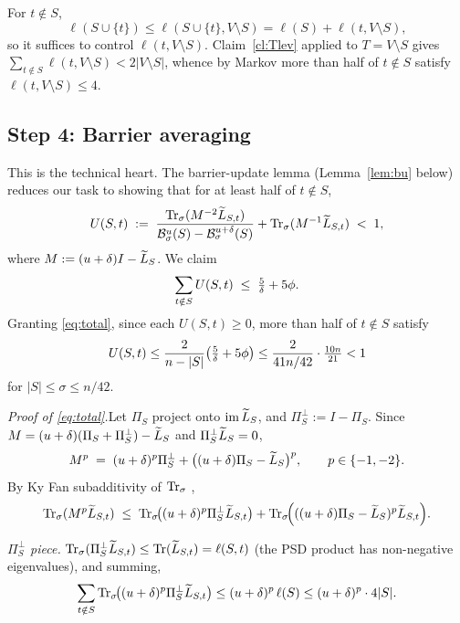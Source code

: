 \documentclass[11pt]{article}
\begin{document}
For $t\notin S$,
\[
  \ell(S\cup\{t\}) \le \ell(S\cup\{t\},V\setminus S)
                   = \ell(S)+\ell(t,V\setminus S),
\]
so it suffices to control $\ell(t,V\setminus S)$. Claim~\ref{cl:Tlev} applied
to $T=V\setminus S$ gives
$\sum_{t\notin S}\ell(t,V\setminus S)<2|V\setminus S|$, whence by Markov more
than half of $t\notin S$ satisfy $\ell(t,V\setminus S)\le 4$.

\subsection*{Step 4: Barrier averaging}

This is the technical heart. The barrier-update lemma (Lemma~\ref{lem:bu}
below) reduces our task to showing that for at least half of $t\notin S$,
\begin{equation}\label{eq:U}
  U(S,t) \;:=\;
  \frac{\operatorname{Tr}_{\sigma}(M^{-2}\widetilde{L}_{S,t})}{\mathcal{B}^{u}_{\sigma}(S)-\mathcal{B}^{u+\delta}_{\sigma}(S)}
   + \operatorname{Tr}_{\sigma}(M^{-1}\widetilde{L}_{S,t}) \;<\; 1,
\end{equation}
where $M:=(u+\delta)I-\widetilde{L}_S$. We claim
\begin{equation}\label{eq:total}
  \sum_{t\notin S} U(S,t) \;\le\; \tfrac{5}{\delta} + 5\phi.
\end{equation}
Granting \eqref{eq:total}, since each $U(S,t)\ge 0$, more than half of
$t\notin S$ satisfy
\[
  U(S,t)\le\frac{2}{n-|S|}\!\left(\tfrac{5}{\delta}+5\phi\right)
        \le \frac{2}{41n/42}\cdot\tfrac{10n}{21} < 1
\]
for $|S|\le\sigma\le n/42$.

\medskip
\noindent\emph{Proof of \eqref{eq:total}.}\quad Let $\Pi_S$ project onto
$\operatorname{im}\widetilde{L}_S$, and $\Pi_S^\perp:=I-\Pi_S$. Since
$M=(u+\delta)(\Pi_S+\Pi_S^\perp)-\widetilde{L}_S$ and $\Pi_S^\perp\widetilde{L}_S=0$,
\[
  M^p \;=\; (u+\delta)^p\Pi_S^\perp + \bigl((u+\delta)\Pi_S-\widetilde{L}_S\bigr)^p,
  \qquad p\in\{-1,-2\}.
\]
By Ky Fan subadditivity of $\operatorname{Tr}_{\sigma}$ \cite[Thm.~4.3.47a]{HJ12},
\begin{equation}\label{eq:split}
  \operatorname{Tr}_{\sigma}(M^p\widetilde{L}_{S,t}) \;\le\;
  \operatorname{Tr}_{\sigma}\!\bigl((u+\delta)^p\Pi_S^\perp\widetilde{L}_{S,t}\bigr)
  + \operatorname{Tr}_{\sigma}\!\Bigl(((u+\delta)\Pi_S-\widetilde{L}_S)^p\widetilde{L}_{S,t}\Bigr).
\end{equation}

\smallskip
\emph{$\Pi_S^\perp$ piece.}\quad
$\operatorname{Tr}_{\sigma}(\Pi_S^\perp\widetilde{L}_{S,t})\le\operatorname{Tr}(\widetilde{L}_{S,t})=\ell(S,t)$ (the PSD product has
non-negative eigenvalues), and summing,
\[
  \sum_{t\notin S}\operatorname{Tr}_{\sigma}\!\bigl((u+\delta)^p\Pi_S^\perp\widetilde{L}_{S,t}\bigr)
   \le (u+\delta)^p\,\ell(S)\le (u+\delta)^p\cdot 4|S|.
\]
\end{document}
